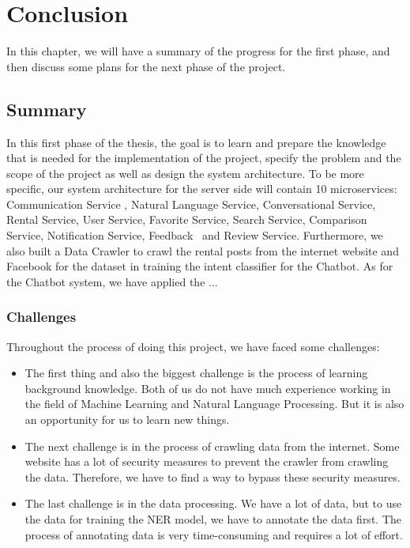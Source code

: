 \chapter{Conclusion}
In this chapter, we will have a summary of the progress for the first phase, and then discuss some plans for the next phase of the project.

\section{Summary}
In this first phase of the thesis, the goal is to learn and prepare the knowledge that is needed for the implementation of the project, specify the problem and the scope of the project as well as design the system architecture. To be more specific, our system architecture for the server side will contain 10 microservices: Communication Service 
, Natural Language Service, Conversational Service, Rental Service, User Service, Favorite Service, Search Service, Comparison Service, Notification Service, Feedback \ and Review Service. Furthermore, we also built a Data Crawler to crawl the rental posts from the internet website and Facebook for the dataset in training the intent classifier for the Chatbot. As for the Chatbot system, we have applied the ...

\subsection{Challenges}
Throughout the process of doing this project, we have faced some challenges:

\begin{itemize}
    \item The first thing and also the biggest challenge is the process of learning background knowledge. Both of us do not have much experience working in the field of Machine Learning and Natural Language Processing. But it is also an opportunity for us to learn new things. 

    \item The next challenge is in the process of crawling data from the internet. Some website has a lot of security measures to prevent the crawler from crawling the data. Therefore, we have to find a way to bypass these security measures.

    \item The last challenge is in the data processing. We have a lot of data, but to use the data for training the NER model, we have to annotate the data first. The process of annotating data is very time-consuming and requires a lot of effort.
\end{itemize}

